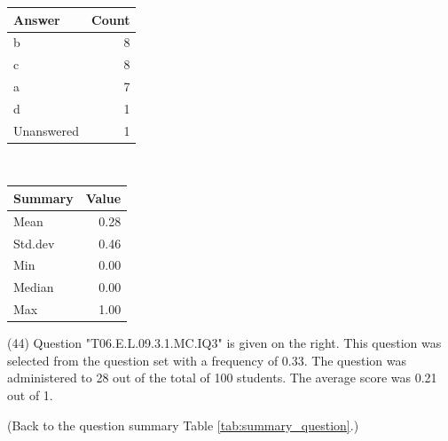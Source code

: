 \documentclass[12pt,nohyper]{tufte-handout}\usepackage[]{graphicx}\usepackage[]{color}
\begin{document}
\begin{center}%
\begin{tabular}{lr}
  \hline
Answer & Count \\ 
  \hline
b &   8 \\ 
  c &   8 \\ 
  a &   7 \\ 
  d &   1 \\ 
  Unanswered &   1 \\ 
   \hline
\end{tabular}
~~~~~~~~%
\begin{tabular}{lr}
  \hline
Summary & Value \\ 
  \hline
Mean & 0.28 \\ 
  Std.dev & 0.46 \\ 
  Min & 0.00 \\ 
  Median & 0.00 \\ 
  Max & 1.00 \\ 
   \hline
\end{tabular}
\end{center}\newpage{} (44) Question "T06.E.L.09.3.1.MC.IQ3" is given on the right. This question was selected from the question set with a frequency of 0.33. The question was administered to 28 out of the total of 100 students. The average score was 0.21 out of 1.

 (Back to the question summary Table \ref{tab:summary_question}.)
\end{document}
